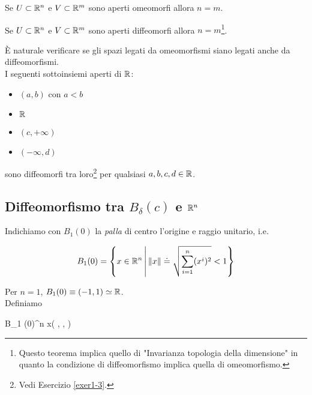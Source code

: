 \begin{theorem}
	Se $ U \subset \mathbb{R}^{n} $ e $ V \subset \mathbb{R}^{m} $ sono aperti omeomorfi allora $ n = m $.
\end{theorem}

\begin{theorem}
	Se $ U \subset \mathbb{R}^{n} $ e $ V \subset \mathbb{R}^{m} $ sono aperti diffeomorfi allora $ n = m $\footnote{%
		Questo teorema implica quello di "Invarianza topologia della dimensione" in quanto la condizione di diffeomorfismo implica quella di omeomorfismo.}.
\end{theorem}

È naturale verificare se gli spazi legati da omeomorfismi siano legati anche da diffeomorfismi. \\
I seguenti sottoinsiemi aperti di $ \mathbb{R} $:

\begin{itemize}
	\item $ (a,b) $ con $ a < b $
	
	\item $ \mathbb{R} $
	
	\item $ (c, + \infty) $
	
	\item $ (- \infty, d) $
\end{itemize}

sono diffeomorfi tra loro\footnote{%
	Vedi Esercizio \ref{exer1-3}.%
} per qualsiasi $ a,b,c,d \in \mathbb{R} $.

\subsection{Diffeomorfismo tra $ B_{\delta} (c) $ e $ \mathbb{R}^{n} $}

Indichiamo con $ B_{1} (0) $ la \textit{palla} di centro l'origine e raggio unitario, i.e.

\begin{equation}
	B_{1} (0) = \left\{ x \in \mathbb{R}^{n} \, \middle| \, \norm{x} \doteq \sqrt{\sum_{i=1}^{n} (x^{i})^{2}} < 1 \right\}
\end{equation}

Per $ n=1 $, $ B_{1} (0) \equiv (-1,1) \simeq \mathbb{R} $. \\
Definiamo

	{B_{1} (0)}{\R^{n}}
	{x}{\left( , \cdots,  \right)}

